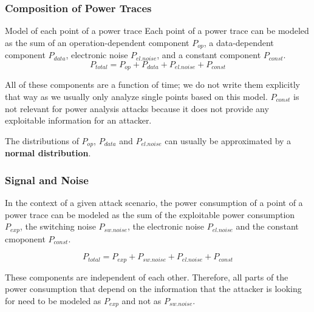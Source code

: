 \begin{frame}
    \frametitle{Composition of Power Traces}

    \begin{block}{Model of each point of a power trace}
        Each point of a power trace can be modeled as the sum of an operation-dependent component $P_{op}$, a data-dependent component $P_{data}$, electronic noise $P_{el.noise}$, and a constant component $P_{const}$.
        \vspace{0.5cm}
        $$ P_{total} = P_{op} + P_{data} + P_{el. noise} + P_{const} $$
        
        All of these components are a function of time; we do not write them explicitly that way as we usually only analyze single points based on this model.\newline
        $P_{const}$ is not relevant for power analysis attacks because it does not provide any exploitable information for an attacker.
    \end{block}
    \begin{alertblock}{}
        The distributions of $P_{op}$, $P_{data}$ and $P_{el.noise}$ can usually be approximated by a \textbf{normal distribution}.
    \end{alertblock}
\end{frame}

\begin{frame}
    \frametitle{Signal and Noise}

        In the context of a given attack scenario, the power consumption of a point of a power trace can be modeled as the sum of the exploitable power consumption $P_{exp}$, the switching noise $P_{sw.noise}$, the electronic noise $P_{el.noise}$ and the constant cmoponent $P_{const}$.

        
        \vspace{0.5cm}
        $$P_{total}=P_{exp}+P_{sw.noise}+P_{el.noise}+P_{const}$$
        \vspace{0.5cm}

        These components are independent of each other. Therefore, all parts of the power consumption that depend on the information that the attacker is looking for need to be modeled as $P_{exp}$ and not as $P_{sw.noise}$. 
\end{frame}


